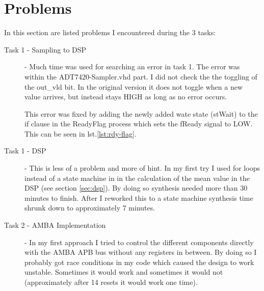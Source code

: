 \documentclass[%
	a4paper,
]
{article}
\begin{document}
\section{Problems}
\label{problems}
In this section are listed problems I encountered during the 3 tasks:

\begin{description}
\item[Task 1 - Sampling to DSP] - Much time was used for searching an error in task 1. The error was
within the ADT7420-Sampler.vhd part. I did not check the the toggling of the out\_vld 
bit. In the original version it does not toggle when a new value arrives, but instead 
stays HIGH as long as no error occurs.

This error was fixed by adding the newly added wate state (stWait) to the if clause in the 
ReadyFlag process which sets the fReady signal to LOW.
This can be seen in lst.\ref{lst:rdy-flag}.


\item[Task 1 - DSP] - This is less of a problem and more of hint. In my first try I used
for loops instead of a state machine in in the calculation of the mean value in the DSP 
(see section \ref{sec:dsp}). By doing so synthesis needed more than 30 minutes to finish.
After I reworked this to a state machine synthesis time shrunk down to approximately 7 
minutes.    


\item[Task 2 - AMBA Implementation] - In my first approach I tried to control the different
components directly with the AMBA APB bus without any registers in between. By doing so I
probably got race conditions in my code which caused the design to work unstable. Sometimes
it would work and sometimes it would not (approximately after 14 resets it would work one time).
\end{description}






%
%
\end{document}
